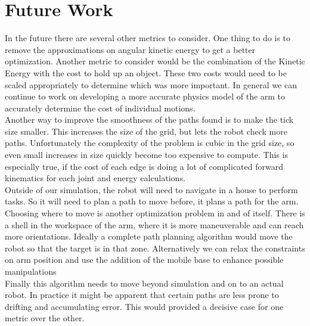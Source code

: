 \documentclass{article}
\begin{document}
\section{Future Work}
In the future there are several other metrics to consider. One thing to do is to remove the approximations on angular kinetic energy to get a better optimization. Another metric to consider would be the combination of the Kinetic Energy with the cost to hold up an object. These two costs would need to be scaled appropriately to determine which was more important. In general we can continue to work on developing a more accurate physics model of the arm to accurately determine the cost of individual motions. \\
Another way to improve the smoothness of the paths found is to make the tick size smaller. This increases the size of the grid, but lets the robot check more paths. Unfortunately the complexity of the problem is cubic in the grid size, so even small increases in size quickly become too expensive to compute. This is especially true, if the cost of each edge is doing a lot of complicated forward kinematics for each joint and energy calculations.\\
Outside of our simulation, the robot will need to navigate in a house to perform tasks. So it will need to plan a path to move before, it plans a path for the arm. Choosing where to move is another optimization problem in and of itself. There is a shell in the workspace of the arm, where it is more maneuverable and can reach more orientations. Ideally a complete path planning algorithm would move the robot so that the target is in that zone. Alternatively we can relax the constraints on arm position and use the addition of the mobile base to enhance possible manipulations\\
Finally this algorithm needs to move beyond simulation and on to an actual robot. In practice it might be apparent that certain paths are less prone to drifting and accumulating error. This would provided a decisive case for one metric over the other. 
\end{document}
